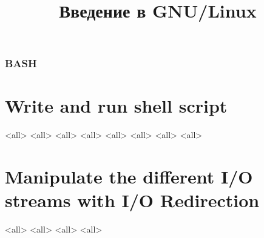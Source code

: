 
\title{Введение в GNU/Linux}




\begin{frame}
	\frametitle{BASH}
	\titlepage
	\vspace{-0.5cm}
	\begin{center}
	\end{center}
\end{frame}

\begin{frame}
	\tableofcontents
\end{frame}





\section{Write and run shell script}
\mode<all>{}
\mode<all>{}
\mode<all>{}
\mode<all>{}
\mode<all>{}
\mode<all>{}
\mode<all>{}
\mode<all>{}

\section{Manipulate the different I/O streams  with I/O Redirection}
\mode<all>{}
\mode<all>{}
\mode<all>{}
\mode<all>{}

